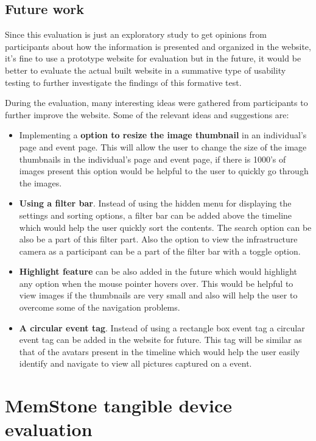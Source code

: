 \documentclass[mscthesis]{usiinfthesis}
\begin{document}
\subsection{Future work}
Since this evaluation is just an exploratory study to get opinions from participants about how the information is presented and organized in the website, it’s fine to use a prototype website for evaluation but in the future, it would be better to evaluate the actual built website in a summative type of usability testing to further investigate the findings of this formative test. 

During the evaluation, many interesting ideas were gathered from participants to further improve the website. Some of the relevant ideas and suggestions are:


\begin{itemize}
\item Implementing a \textbf{option to resize the image thumbnail} in an individual's page and event page. This will allow the user to change the size of the image thumbnails in the individual's page and event page, if there is 1000's of images present this option would be helpful to the user to quickly go through the images. 
\item \textbf{Using a filter bar}. Instead of using the hidden menu for displaying the settings and sorting options, a filter bar can be added above the timeline which would help the user quickly sort the contents. The search option can be also be a part of this filter part. Also the option to view the infrastructure camera as a participant can be a part of the filter bar with a toggle option. 
\item \textbf{Highlight feature} can be also added in the future which would highlight any option when the mouse pointer hovers over. This would be helpful to view images if the thumbnails are very small and also will help the user to overcome some of the navigation problems.
\item \textbf{A circular event tag}. Instead of using a rectangle box event tag a circular event tag can be added in the website for future. This tag will be similar as that of the avatars present in the timeline which would help the user easily identify and navigate to view all pictures captured on a event. 
 
\end{itemize}

\section{MemStone tangible device evaluation}
\end{document}
